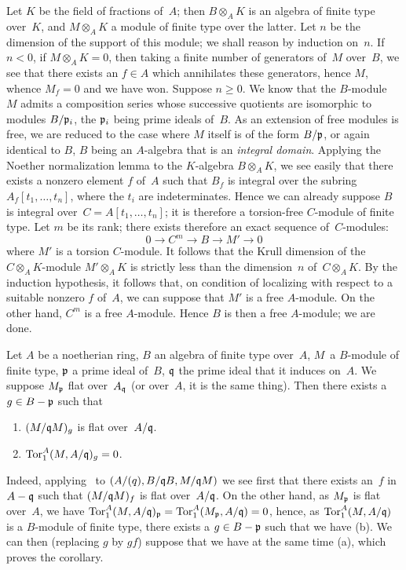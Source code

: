 Let $K$ be the field of fractions of~$A$; then $B\otimes_A K$ is an
algebra of finite type over~$K$, and $M\otimes_A K$ a module of finite
type over the latter. Let $n$ be the dimension of the support of this
module; we shall reason by induction on~$n$.
If $n<0$,
\ie if $M\otimes_A K=0$, then taking a finite number of
generators of~$M$ over~$B$, we see that there exists an $f\in A$
which annihilates these generators, hence $M$, whence $M_f=0$ and we have
won. Suppose $n\ge 0$. We know that the $B$-module~$M$ admits
a composition series whose successive quotients are isomorphic
to modules $B/\mathfrak{p}_i$, the $\mathfrak{p}_i$ being
prime ideals of~$B$. As an extension of free modules is
free, we are reduced to the case where $M$ itself is of the
form $B/\mathfrak{p}$, or again identical to $B$, $B$ being an
$A$-algebra that is an \emph{integral domain}. Applying the Noether
normalization lemma to the $K$-algebra $B\otimes_A K$, we
see easily that there exists a nonzero element $f$ of~$A$ such
that $B_f$ is integral over the subring $A_f[t_1,\dots,t_n]$, where
the $t_i$ are indeterminates. Hence we can already
suppose $B$ is integral over~$C=A[t_1,\dots,t_n]$; it is therefore a
torsion-free $C$-module of finite type. Let $m$ be its rank; there exists
therefore an exact sequence of~$C$-modules:
$$
0\to C^m\to B\to M'\to 0
$$
where $M'$ is a torsion $C$-module. It follows that the
Krull dimension of the~$C\otimes_A K$-module $M'\otimes_A K$ is
strictly less than the dimension~$n$ of~$C\otimes_A K$.
By the induction hypothesis, it follows that, on
condition of localizing with respect to a suitable nonzero $f$
of~$A$, we can suppose that $M'$ is a free
$A$-module. On the other hand, $C^m$ is a free $A$-module. Hence $B$ is
then a free $A$-module; we are done.

\begin{lemma}
\label{IV.6.8}
Let $A$ be a noetherian ring, $B$ an algebra of finite type
over~$A$, $M$~a $B$-module of finite type, $\mathfrak{p}$ a prime
ideal of~$B$, $\mathfrak{q}$ the prime ideal that it induces on~$A$. We suppose $M_\mathfrak{p}$ flat over~$A_{\mathfrak{q}}$ (or over~$A$,
it is the same thing). Then there exists a $g\in B-\mathfrak{p}$ such that
\begin{enumerate}
\item[(a)] $(M/\mathfrak{q}M)_g$ is flat over~$A/\mathfrak{q}$.
\item[(b)] $\operatorname{Tor}_1^A(M,A/\mathfrak{q})_g=0$.
\end{enumerate}
\end{lemma}
Indeed, applying~ to $(A/\mathfrak(q), B/\mathfrak{q}B,
M/\mathfrak{q}M)$ we see first that there exists an~$f$ in $A-\mathfrak{q}$
such that $(M/\mathfrak{q}M)_f$ is flat over~$A/\mathfrak{q}$. On the other hand,
as $M_\mathfrak{p}$ is flat over~$A$, we have
$\operatorname{Tor}_1^A(M,A/\mathfrak{q})_\mathfrak{p}=\operatorname{Tor}_1^A(M_\mathfrak{p},A/\mathfrak{q})=0$,
hence, as $\operatorname{Tor}_1^A(M,A/\mathfrak{q})$ is a $B$-module of finite type, there
exists a $g\in B-\mathfrak{p}$ such that we have (b). We can then
(replacing $g$ by $gf$) suppose that we have at the same time (a),
which proves the corollary.

